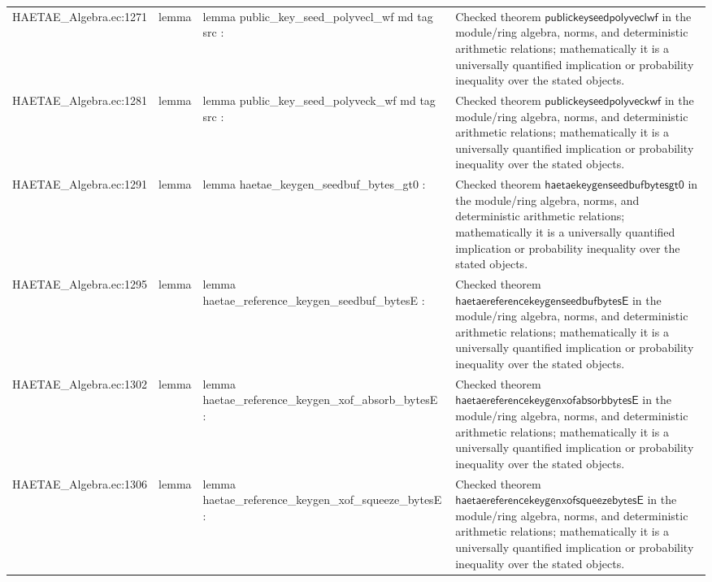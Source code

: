 \documentclass[10pt]{article}
\begin{document}
\begin{longtable}{L{0.11\textwidth}L{0.055\textwidth}L{0.385\textwidth}L{0.41\textwidth}}
HAETAE\_\allowbreak{}Algebra.\allowbreak{}ec:\allowbreak{}1271 & lemma & {\ttfamily\scriptsize lemma public\_\allowbreak{}key\_\allowbreak{}seed\_\allowbreak{}polyvecl\_\allowbreak{}wf md tag src :} & Checked theorem $\mathsf{publickeyseedpolyveclwf}$ in the module/ring algebra, norms, and deterministic arithmetic relations; mathematically it is a universally quantified implication or probability inequality over the stated objects. \\
HAETAE\_\allowbreak{}Algebra.\allowbreak{}ec:\allowbreak{}1281 & lemma & {\ttfamily\scriptsize lemma public\_\allowbreak{}key\_\allowbreak{}seed\_\allowbreak{}polyveck\_\allowbreak{}wf md tag src :} & Checked theorem $\mathsf{publickeyseedpolyveckwf}$ in the module/ring algebra, norms, and deterministic arithmetic relations; mathematically it is a universally quantified implication or probability inequality over the stated objects. \\
HAETAE\_\allowbreak{}Algebra.\allowbreak{}ec:\allowbreak{}1291 & lemma & {\ttfamily\scriptsize lemma haetae\_\allowbreak{}keygen\_\allowbreak{}seedbuf\_\allowbreak{}bytes\_\allowbreak{}gt0 :} & Checked theorem $\mathsf{haetaekeygenseedbufbytesgt0}$ in the module/ring algebra, norms, and deterministic arithmetic relations; mathematically it is a universally quantified implication or probability inequality over the stated objects. \\
HAETAE\_\allowbreak{}Algebra.\allowbreak{}ec:\allowbreak{}1295 & lemma & {\ttfamily\scriptsize lemma haetae\_\allowbreak{}reference\_\allowbreak{}keygen\_\allowbreak{}seedbuf\_\allowbreak{}bytesE :} & Checked theorem $\mathsf{haetaereferencekeygenseedbufbytesE}$ in the module/ring algebra, norms, and deterministic arithmetic relations; mathematically it is a universally quantified implication or probability inequality over the stated objects. \\
HAETAE\_\allowbreak{}Algebra.\allowbreak{}ec:\allowbreak{}1302 & lemma & {\ttfamily\scriptsize lemma haetae\_\allowbreak{}reference\_\allowbreak{}keygen\_\allowbreak{}xof\_\allowbreak{}absorb\_\allowbreak{}bytesE :} & Checked theorem $\mathsf{haetaereferencekeygenxofabsorbbytesE}$ in the module/ring algebra, norms, and deterministic arithmetic relations; mathematically it is a universally quantified implication or probability inequality over the stated objects. \\
HAETAE\_\allowbreak{}Algebra.\allowbreak{}ec:\allowbreak{}1306 & lemma & {\ttfamily\scriptsize lemma haetae\_\allowbreak{}reference\_\allowbreak{}keygen\_\allowbreak{}xof\_\allowbreak{}squeeze\_\allowbreak{}bytesE :} & Checked theorem $\mathsf{haetaereferencekeygenxofsqueezebytesE}$ in the module/ring algebra, norms, and deterministic arithmetic relations; mathematically it is a universally quantified implication or probability inequality over the stated objects. \\

\end{longtable}
\end{document}
